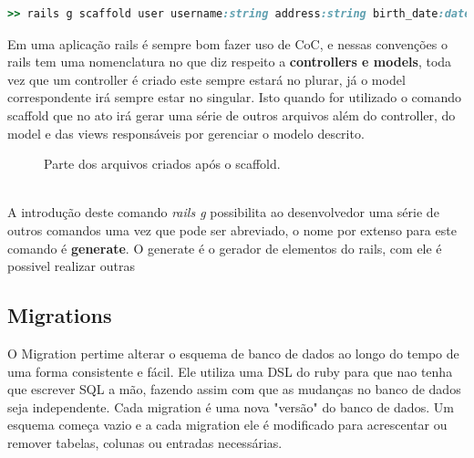 {\singlespace
\begin{lstlisting}[caption=Exemplo de uso de scaffold, language=Ruby,label={scaffold}]
  >> rails g scaffold user username:string address:string birth_date:date
\end{lstlisting}
}

Em uma aplicação rails é sempre bom fazer uso de CoC, e nessas convenções o rails tem uma nomenclatura no que diz respeito a \textbf{controllers e models}, toda vez que um controller é criado
este sempre estará no plurar, já o model correspondente irá sempre estar no singular. Isto quando for utilizado o comando scaffold que no ato irá gerar uma série de outros arquivos além do controller, 
do model e das views responsáveis por gerenciar o modelo descrito. 
\begin{figure}[ht]
    \centering
    \caption{Parte dos arquivos criados após o scaffold.}
    \label{submeter}
\end{figure}
\\

A introdução deste comando \textit{rails g} possibilita ao desenvolvedor uma série de outros comandos
uma vez que pode ser abreviado, o nome por extenso para este comando é \textbf{generate}. O generate é o gerador de elementos do rails, com ele é possivel realizar outras 

\subsection{Migrations}
O Migration pertime alterar o esquema de banco de dados ao longo do tempo de uma forma consistente e fácil.
Ele utiliza uma DSL do ruby para que nao tenha que escrever SQL a mão, fazendo assim com que as mudanças no banco de dados
seja independente. Cada migration é uma nova "versão" do banco de dados. Um esquema começa vazio e a cada migration ele é modificado
para acrescentar ou remover tabelas, colunas ou entradas necessárias.


